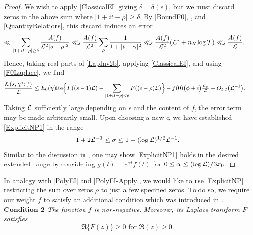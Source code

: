 \documentclass[12pt,psamsfonts]{amsart}
\theoremstyle{definition}
\theoremstyle{remark}
\numberwithin{equation}{section}
\begin{document}
\begin{proof}
We wish to apply \cref{ClassicalEI} giving $\delta = \delta(\epsilon)$, but we must discard zeros in the above sum where $|1+it-\rho| \geq \delta$. By \eqref{BoundF0}, \cite[Lemma 2.1]{LMO}, and \cref{QuantityRelations}, this discard induces an error
\begin{align*}
\ll \sum_{|1+it-\rho|\geq \delta} \frac{A(f)}{\mathcal{L}^2|s-\rho|^2} 
& \ll_{\delta} \frac{A(f)}{\mathcal{L}^2} \sum_{\rho} \frac{1}{1+|t-\gamma|^2} \ll_{\delta} \frac{A(f)}{\mathcal{L}^2}(\mathcal{L}^*+n_K \log \mathcal{T}) \ll_{\delta} \frac{A(f) }{\mathcal{L}}.
\end{align*}
Hence, taking real parts of \eqref{LapInv2b}, applying \cref{ClassicalEI}, and using \eqref{F0Laplace}, we find
\begin{align*}
\frac{\mathcal{K}(s,\chi^*; f)}{ \mathcal{L}}  & \leq E_0(\chi) \mathrm{Re}\Big\{ F((s-1)\mathcal{L})  -\sum_{|1+it-\rho| < \delta}  F((s-\rho)\mathcal{L}) \Big\} + f(0) \big( \phi + \epsilon \big) \tfrac{\mathcal{L}_{\chi}}{\mathcal{L}}  + O_{\delta, \mathcal{C}}\big( \mathcal{L}^{-1} \big).
\end{align*}
Taking $\mathcal{L}$ sufficiently large depending on $\epsilon$ and the content of $f$, the error term may be made arbitrarily small. Upon choosing a new $\epsilon$, we have established \eqref{ExplicitNP1} in the range
\[
1+2\mathcal{L}^{-1} \leq \sigma \leq 1 + (\log \mathcal{L})^{1/2} \mathcal{L}^{-1}.
\]
Similar to the discussion in \cite[Section 5, p.22-23]{HBLinnik}, one may show \eqref{ExplicitNP1} holds in the desired extended range by considering $g(t) = e^{\alpha t}f(t)$ for  $0 \leq \alpha \leq (\log \mathcal{L})/3x_0$. 
\end{proof}

In analogy with \cref{PolyEI} and \cref{PolyEI-Apply}, we would like to use \cref{ExplicitNP} restricting the sum over zeros $\rho$ to just a few specified zeros. To do so, we require our weight $f$ to satisfy an additional condition which was introduced in \cite[Section 6]{HBLinnik}. \\


\noindent
\textbf{Condition 2} \emph{The function $f$ is non-negative. Moreover, its Laplace transform $F$ satisfies
\[
\Re\{ F(z) \} \geq 0 \text{ for $\Re(z) \geq 0$}.
\]
}
\end{document}
